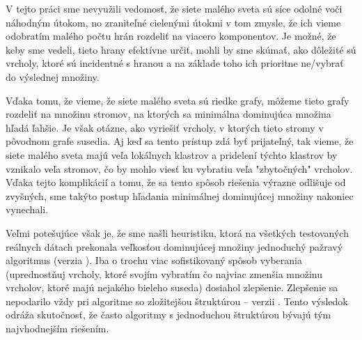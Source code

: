 V tejto práci sme nevyužili vedomosť, že siete malého sveta sú síce odolné voči 
náhodným útokom, no zraniteľné cielenými útokmi v tom zmysle, že ich vieme 
odobratím malého počtu hrán rozdeliť na viacero komponentov. Je možné, že keby 
sme vedeli, tieto hrany efektívne určiť, mohli by sme skúmať, ako dôležité sú 
vrcholy, ktoré sú incidentné s hranou a na základe toho ich prioritne ne/vybrať 
do výslednej množiny.

Vďaka tomu, že vieme, že siete malého sveta sú riedke grafy, môžeme tieto grafy 
rozdeliť na množinu stromov, na ktorých sa minimálna dominujúca množina hľadá 
ľahšie. Je však otázne, ako vyriešiť vrcholy, v ktorých tieto stromy v pôvodnom 
grafe susedia. Aj keď sa tento prístup zdá byť prijateľný, tak vieme, že siete 
malého sveta majú veľa lokálnych klastrov a pridelení týchto klastrov by 
vznikalo veľa stromov, čo by mohlo viesť ku vybratiu veľa "zbytočných" 
vrcholov. Vďaka tejto komplikácií a tomu, že sa tento spôsob riešenia výrazne 
odlišuje od zvyšných, sme takýto postup hľadania minimálnej dominujúcej množiny 
nakoniec vynechali.

Veľmi potešujúce však je, že sme našli heuristiku, ktorá na všetkých 
testovaných reálnych dátach prekonala veľkosťou dominujúcej množiny 
jednoduchý pažravý algoritmus (verzia ). Iba o trochu viac 
sofistikovaný spôsob vyberania (uprednostňuj vrcholy, ktoré svojím vybratím 
čo najviac zmenšia množinu vrcholov, ktoré majú nejakého bieleho suseda) 
dosiahol zlepšenie. Zlepšenie sa nepodarilo vždy pri algoritme so zložitejšou 
štruktúrou -- verzii .
Tento výsledok odráža skutočnosť, že často algoritmy s 
jednoduchou štruktúrou bývajú tým najvhodnejším riešením.

\cleardoublepage
{}
{}

\printbibliography

\backmatter

\newpage
\pagestyle{empty}
\hbox{}